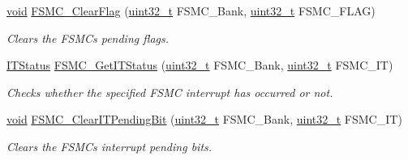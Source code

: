 \begin{DoxyCompactItemize}
\hyperlink{usb__devapi_8h_afabf60e7f57651d6d595a02c75f07cd0}{void} \hyperlink{group___f_s_m_c___exported___functions_ga697618f2de0ad9a8a82461ddbebd5264}{F\+S\+M\+C\+\_\+\+Clear\+Flag} (\hyperlink{_p_e___types_8h_a33594304e786b158f3fb30289278f5af}{uint32\+\_\+t} F\+S\+M\+C\+\_\+\+Bank, \hyperlink{_p_e___types_8h_a33594304e786b158f3fb30289278f5af}{uint32\+\_\+t} F\+S\+M\+C\+\_\+\+F\+L\+AG)
\begin{DoxyCompactList}\small\item\em Clears the F\+S\+MC\textquotesingle{}s pending flags. \end{DoxyCompactList}\item 
\hyperlink{agilefox_2library_2inc_2stm32f10x__type_8h_aacbd7ed539db0aacd973a0f6eca34074}{I\+T\+Status} \hyperlink{group___f_s_m_c___exported___functions_ga7fce9ca889d33cd8b8b7413875dd4d73}{F\+S\+M\+C\+\_\+\+Get\+I\+T\+Status} (\hyperlink{_p_e___types_8h_a33594304e786b158f3fb30289278f5af}{uint32\+\_\+t} F\+S\+M\+C\+\_\+\+Bank, \hyperlink{_p_e___types_8h_a33594304e786b158f3fb30289278f5af}{uint32\+\_\+t} F\+S\+M\+C\+\_\+\+IT)
\begin{DoxyCompactList}\small\item\em Checks whether the specified F\+S\+MC interrupt has occurred or not. \end{DoxyCompactList}\item 
\hyperlink{usb__devapi_8h_afabf60e7f57651d6d595a02c75f07cd0}{void} \hyperlink{group___f_s_m_c___exported___functions_gad9387e7674b8a376256a3378649e004e}{F\+S\+M\+C\+\_\+\+Clear\+I\+T\+Pending\+Bit} (\hyperlink{_p_e___types_8h_a33594304e786b158f3fb30289278f5af}{uint32\+\_\+t} F\+S\+M\+C\+\_\+\+Bank, \hyperlink{_p_e___types_8h_a33594304e786b158f3fb30289278f5af}{uint32\+\_\+t} F\+S\+M\+C\+\_\+\+IT)
\begin{DoxyCompactList}\small\item\em Clears the F\+S\+MC\textquotesingle{}s interrupt pending bits. \end{DoxyCompactList}\end{DoxyCompactItemize}
